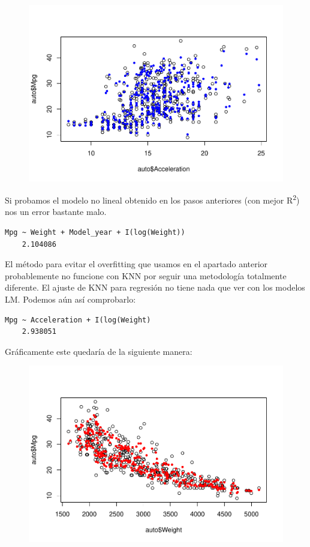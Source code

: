 \begin{figure}[H]\includegraphics[width=.9\linewidth]{img/Regresion_files/figure-latex/unnamed-chunk-29-2} \caption{}\end{figure}

Si probamos el modelo no lineal obtenido en los pasos anteriores (con mejor R\textsuperscript{2}) nos un error bastante malo.
\begin{verbatim}
Mpg ~ Weight + Model_year + I(log(Weight))
    2.104086
\end{verbatim}

\vspace{\baselineskip}

El método para evitar el overfitting que usamos en el apartado anterior probablemente no funcione con KNN por seguir una metodología totalmente diferente. El ajuste de KNN para regresión no tiene nada que ver con los modelos LM. Podemos aún así comprobarlo:
\begin{verbatim}
Mpg ~ Acceleration + I(log(Weight)
    2.938051
\end{verbatim}

Gráficamente este quedaría de la siguiente manera:
\begin{figure}[H]\includegraphics[width=.9\linewidth]{img/Regresion_files/figure-latex/unnamed-chunk-32-1} \caption{}\end{figure}

